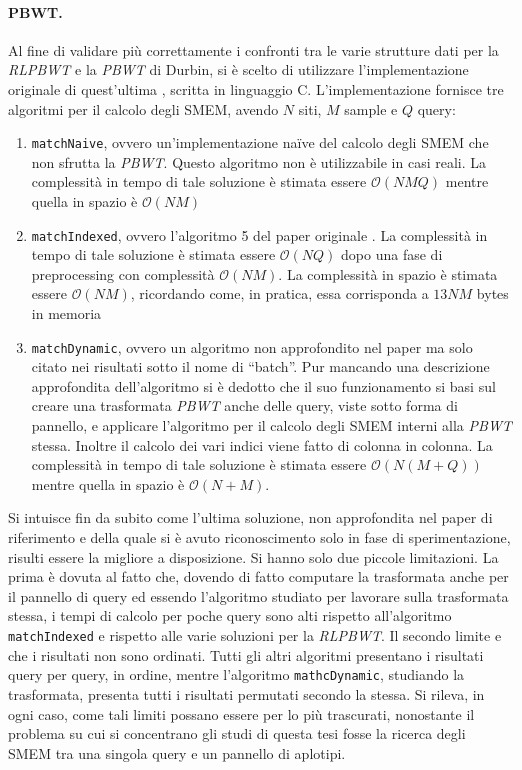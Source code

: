 \paragraph{PBWT.}
Al fine di validare più correttamente i confronti tra le varie strutture dati
per la \textit{RLPBWT} e la \textit{PBWT} di Durbin, si è scelto di utilizzare
l'implementazione originale di quest'ultima \cite{durbin_gh}, scritta in
linguaggio C. L'implementazione
fornisce tre algoritmi per il calcolo degli SMEM, avendo $N$ siti, $M$ sample e
$Q$ query:
\begin{enumerate}
  \item \texttt{matchNaive}, ovvero un'implementazione na\"{i}ve del calcolo
  degli SMEM che non sfrutta la \textit{PBWT}. Questo algoritmo non è
  utilizzabile in casi reali. La complessità in tempo di tale 
  soluzione è stimata essere $\mathcal{O}(NMQ)$ mentre quella in spazio è
  $\mathcal{O}(NM)$
  \item \texttt{matchIndexed}, ovvero l'algoritmo 5 del paper originale
  \cite{pbwt}. La complessità in tempo di tale 
  soluzione è stimata essere $\mathcal{O}(NQ)$ dopo una fase di preprocessing
  con complessità $\mathcal{O}(NM)$. La complessità in spazio è stimata essere
  $\mathcal{O}(NM)$, ricordando come, in pratica, essa corrisponda a $13NM$
  bytes in memoria
  \item \texttt{matchDynamic}, ovvero un algoritmo non approfondito nel paper ma
  solo citato nei risultati sotto il nome di ``batch''. Pur mancando una
  descrizione approfondita dell'algoritmo si è dedotto che il suo funzionamento
  si basi sul creare una trasformata \textit{PBWT} anche delle query, viste
  sotto forma di pannello, e applicare l'algoritmo per il calcolo degli SMEM
  interni alla \textit{PBWT} stessa. Inoltre il calcolo dei vari indici viene
  fatto di colonna in colonna. La complessità in tempo di tale 
  soluzione è stimata essere $\mathcal{O}(N(M+Q))$ mentre quella in spazio è
  $\mathcal{O}(N+M)$. 
\end{enumerate}
Si intuisce fin da subito come l'ultima soluzione, non approfondita nel paper di
riferimento e della quale si è avuto riconoscimento solo in fase di
sperimentazione, risulti essere la migliore a disposizione. Si hanno solo due
piccole limitazioni. La prima è dovuta al fatto che, dovendo di fatto computare
la trasformata anche per il pannello di query ed essendo l'algoritmo studiato
per lavorare sulla trasformata stessa, i tempi di calcolo per poche query sono
alti rispetto all'algoritmo \texttt{matchIndexed} e rispetto alle varie
soluzioni per la \textit{RLPBWT}. Il secondo limite e che i risultati non sono
ordinati. Tutti gli altri algoritmi presentano i risultati query per query, in
ordine, mentre l'algoritmo \texttt{mathcDynamic}, studiando la trasformata,
presenta tutti i risultati permutati secondo la stessa. Si rileva, in ogni caso,
come tali limiti possano essere per lo più trascurati, nonostante il problema su
cui si concentrano gli studi di questa tesi fosse la ricerca degli SMEM tra una
singola query e un pannello di aplotipi.
